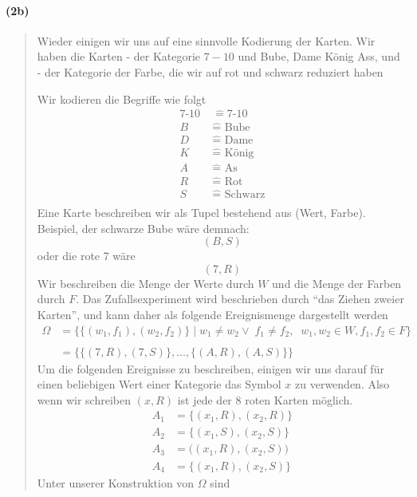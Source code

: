 \documentclass[
]{article}
\begin{document}
\paragraph{(2b)}\label{b}

\begin{quote}
Wieder einigen wir uns auf eine sinnvolle Kodierung der Karten. Wir
haben die Karten - der Kategorie \(7-10\) und Bube, Dame König Ass, und
- der Kategorie der Farbe, die wir auf rot und schwarz reduziert haben

Wir kodieren die Begriffe wie folgt \[\begin{align}
7\text{-}10 &\; \widehat{ = } 7\text{-}10   \\
B &\; \widehat{ = } \text{ Bube}  \\
D &\; \widehat{ = } \text{ Dame}  \\
K &\; \widehat{ = } \text{ König}  \\
A &\; \widehat{ = } \text{ As}  \\
R &\; \widehat{ = } \text{ Rot}  \\
S &\; \widehat{ = } \text{ Schwarz}  \\
\end{align}\] Eine Karte beschreiben wir als Tupel bestehend aus (Wert,
Farbe). Beispiel, der schwarze Bube wäre demnach: \[(B, S)\] oder die
rote 7 wäre \[(7, R)\] Wir beschreiben die Menge der Werte durch \(W\)
und die Menge der Farben durch \(F\). Das Zufallsexperiment wird
beschrieben durch ``das Ziehen zweier Karten'', und kann daher als
folgende Ereignismenge dargestellt werden \[\begin{align}
\Omega &= \Big\{\{ (w_{1},f_{1}), (w_{2},f_{2}) \} \; \Big| \; w_{1} \neq w_{2} \lor \;f_{1} \neq f_{2}, \;\; w_{1},w_{2} \in W, f_{1},f_{2} \in F  \Big\} \\ \\
&= \Big\{ \{ (7,R), (7, S) \}, \dots, \{(A, R), (A,S)  \} \Big\}
\end{align}\] Um die folgenden Ereignisse zu beschreiben, einigen wir
uns darauf für einen beliebigen Wert einer Kategorie das Symbol \(x\) zu
verwenden. Also wenn wir schreiben \((x, R)\) ist jede der 8 roten
Karten möglich. \[\begin{align}
A_{1} &= \Big\{ (x_{1}, R), (x_{2}, R) \Big\} \\
A_{2} &= \Big\{ (x_{1}, S), (x_{2}, S)\Big\} \\
A_{3} &= \Big((x_{1}, R), (x_{2}, S)\Big) \\
A_{4} &= \Big\{ (x_{1}, R), (x_{2},  S) \Big\}
\end{align}\] Unter unserer Konstruktion von \(\Omega\) sind

\end{quote}
\end{document}
